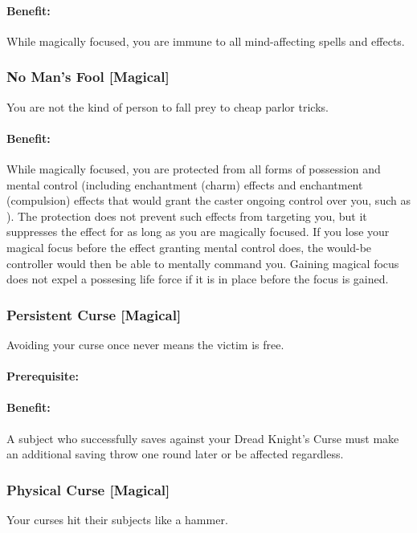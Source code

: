 \paragraph{Benefit:} While magically focused, you are immune to all mind-affecting spells and effects.

\subsubsection[No Man's Fool]{No Man's Fool [Magical]}
\label{Feat:NoMansFool}
You are not the kind of person to fall prey to cheap parlor tricks.
\paragraph{Benefit:} While magically focused, you are protected from all forms of possession and mental control (including enchantment (charm) effects and enchantment (compulsion) effects that would grant the caster ongoing control over you, such as ). 
The protection does not prevent such effects from targeting you, but it suppresses the effect for as long as you are magically focused. 
If you lose your magical focus before the effect granting mental control does, the would-be controller would then be able to mentally command you. 
Gaining magical focus does not expel a possesing life force if it is in place before the focus is gained. 

\subsubsection[Persistent Curse]{Persistent Curse [Magical]}
\label{Feat:PersistentCurse}
Avoiding your curse once never means the victim is free.
\paragraph{Prerequisite:} 
\paragraph{Benefit:} A subject who successfully saves against your Dread Knight's Curse must make an additional saving throw one round later or be affected regardless.

\subsubsection[Physical Curse]{Physical Curse [Magical]}
\label{Feat:PhysicalCurse}
Your curses hit their subjects like a hammer.
